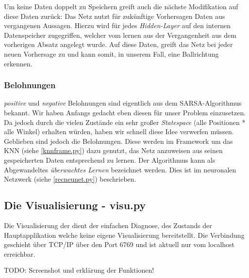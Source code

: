 \documentclass[12pt,twoside]{article}
\theoremstyle{plain}
\theoremstyle{definition}
\theoremstyle{remark}
\begin{document}
Um keine Daten doppelt zu Speichern greift auch die nächste Modifikation auf diese Daten zurück: Das Netz nutzt für zukünftige Vorhersagen Daten aus vergangenen Aussagen. Hierzu wird für jedes \textit{Hidden-Layer} auf den internen Datenspeicher zugegriffen, welcher vom lernen aus der Vergangenheit aus dem vorherigen Absatz angelegt wurde. Auf diese Daten, greift das Netz bei jeder neuen Vorhersage zu und kann somit, in unserem Fall, eine Ballrichtung erkennen. 


\subsubsection{Belohnungen}
\label{rewards}

\textit{positive} und \textit{negative} Belohnungen sind eigentlich aus dem SARSA-Algorithmus bekannt. Wir haben Anfangs gedacht eben diesen für unser Problem einzusetzen. Da jedoch durch die vielen Zustände ein sehr großer \textit{Statespace} (alle Positionen * alle Winkel) erhalten würden, haben wir schnell diese Idee verwerfen müssen. Geblieben sind jedoch die Belohnungen. Diese werden im Framework um das KNN (siehe \ref{knnframe.py}) dazu genutzt, das Netz anzuweisen aus seinen gespeicherten Daten entsprechend zu lernen. Der Algorithmus kann als Abgewandeltes \textit{überwachtes Lernen} bezeichnet werden. Dies ist im neuronalen Netzwerk (siehe \ref{recneunet.py}) beschrieben.


\subsection{Die Visualisierung - visu.py}
\label{visu.py}

Die Visualisierung der dient der einfachen Diagnose, des Zustands der Hauptapplikation welche keine eigene Visualisierung bereitstellt. Die Verbindung geschieht über TCP/IP über den Port 6769 und ist aktuell nur vom localhost erreichbar.

TODO: Screenshot und erklärung der Funktionen! 
\end{document}
